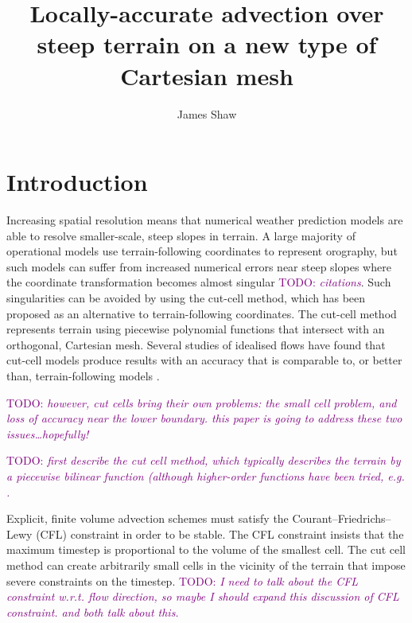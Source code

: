 \documentclass{article}
\title{Locally-accurate advection over steep terrain on a new type of Cartesian mesh \\ \TODO{(working title)}}
\author{James Shaw}
\newcommand{\TODO}[1]{\textcolor{purple}{TODO: \emph{#1}}}
\begin{document}
\maketitle

\section{Introduction}

Increasing spatial resolution means that numerical weather prediction models are able to resolve smaller-scale, steep slopes in terrain.  A large majority of operational models use terrain-following coordinates to represent orography, but such models can suffer from increased numerical errors near steep slopes where the coordinate transformation becomes almost singular \TODO{citations}.  Such singularities can be avoided by using the cut-cell method, which has been proposed as an alternative to terrain-following coordinates.  The cut-cell method represents terrain using piecewise polynomial functions that intersect with an orthogonal, Cartesian mesh.  Several studies of idealised flows have found that cut-cell models produce results with an accuracy that is comparable to, or better than, terrain-following models \citep{yamazaki-satomura2008,good2014,shaw-weller2016}.

\TODO{however, cut cells bring their own problems: the small cell problem, and loss of accuracy near the lower boundary.  this paper is going to address these two issues\ldots hopefully!}



\TODO{first describe the cut cell method, which typically describes the terrain by a piecewise bilinear function (although higher-order functions have been tried, e.g. \citet{kirkpatrick2003}.}

Explicit, finite volume advection schemes must satisfy the Courant--Friedrichs--Lewy (CFL) constraint in order to be stable.  The CFL constraint insists that the maximum timestep is proportional to the volume of the smallest cell.  The cut cell method can create arbitrarily small cells in the vicinity of the terrain that impose severe constraints on the timestep.
\TODO{I need to talk about the CFL constraint w.r.t. flow direction, so maybe I should expand this discussion of CFL constraint.  \citet{adcroft1997} and \citet{kirkpatrick2003} both talk about this.}
\end{document}
